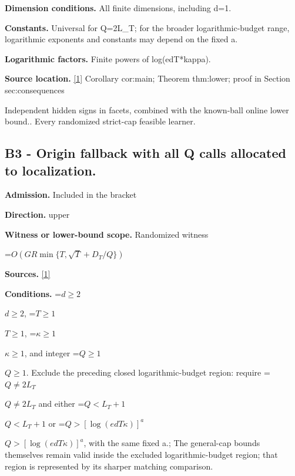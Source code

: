 \documentclass[10pt,a4paper]{article}
\newcommand{\AtlasMath}[1]{\par\begingroup\centering\setbox0=\hbox{$\displaystyle #1$}\ifdim\wd0>1.4\linewidth\typeout{ATLAS WIDE FORMULA: \the\wd0}\fi\ifdim\wd0>\linewidth\resizebox{\linewidth}{!}{\box0}\else\box0\fi\par\endgroup}
\newcommand{\AtlasInlineMath}[1]{\begingroup\setbox0=\hbox{$#1$}\ifdim\wd0>.4\linewidth\endgroup\AtlasMath{#1}\else\endgroup$#1$\fi}
\begin{document}
\textbf{Dimension conditions.} All finite dimensions, including d=1.



\textbf{Constants.} Universal for Q=2L\_T; for the broader logarithmic-budget range, logarithmic exponents and constants may depend on the fixed a.



\textbf{Logarithmic factors.} Finite powers of log(edT*kappa).



\textbf{Source location.} \href{https://github.com/WU-Wendao/Colombo/blob/main/colombo_sensorium/Complexity_altas/data/sources/colombo/U08/manuscript.pdf}{[1]} Corollary cor:main; Theorem thm:lower; proof in Section sec:consequences



Independent hidden signs in facets, combined with the known-ball online lower bound.. Every randomized strict-cap feasible learner.



\subsection{B3 - Origin fallback with all Q calls allocated to localization.}


\textbf{Admission.} Included in the bracket



\textbf{Direction.} upper



\textbf{Witness or lower-bound scope.} Randomized witness



\AtlasMath{O(GR\min\{T,\sqrt T+D_T/Q\})}


\textbf{Sources.} \href{https://github.com/WU-Wendao/Colombo/blob/main/colombo_sensorium/Complexity_altas/data/sources/colombo/U08/manuscript.pdf}{[1]}



\textbf{Conditions.} \AtlasInlineMath{d\ge2}, \AtlasInlineMath{T\ge1}, \AtlasInlineMath{\kappa\ge1}, and integer \AtlasInlineMath{Q\ge1}. Exclude the preceding closed logarithmic-budget region: require \AtlasInlineMath{Q\ne2L_T} and either \AtlasInlineMath{Q<L_T+1} or \AtlasInlineMath{Q>[\log(edT\kappa)]^a}, with the same fixed a.; The general-cap bounds themselves remain valid inside the excluded logarithmic-budget region; that region is represented by its sharper matching comparison.
\end{document}
